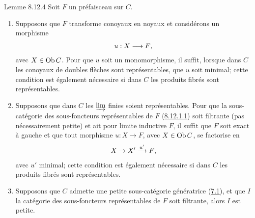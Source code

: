 \documentclass[10pt]{../fichiers-configuration-latex/smfart}
\def\labelenumi{(\theenumi)}
\begin{document}
\begin{enonce*}{Lemme 8.12.4}
Soit $F$ un préfaisceau sur $C$.
\begin{enumerate}
\renewcommand{\theenumi}{\alph{enumi}}
\renewcommand{\labelenumi}{\theenumi)}
\item Supposons que $F$ transforme conoyaux en noyaux et considérons
un morphisme
$$
u:X\longrightarrow F{},
$$
avec $X\in \operatorname{Ob} C$. Pour que $u$ soit un monomorphisme, il suffit,
lorsque dans $C$ les conoyaux de doubles flèches sont
représentables, que $u$ soit minimal; cette condition est également
nécessaire si dans $C$ les produits fibrés sont représentables.

\item Supposons que dans $C$ les $\varinjlim$ finies soient
représentables. Pour que %
la sous-catégorie des sous-foncteurs représentables de $F$
(\hyperref[I.8.12.1.1]{8.12.1.1}) soit filtrante (pas nécessairement petite) et ait
pour limite inductive $F$, il suffit que $F$ soit exact à gauche et
que tout morphisme $u:X\rightarrow F$, avec $X\in \operatorname{Ob} C$, se
factorise en
$$
X\rightarrow X'\xrightarrow{u'}F{},
$$
avec $u'$ minimal; cette condition est également nécessaire si dans
$C$ les produits fibrés sont représentables.

\item Supposons que $C$ admette une petite sous-catégorie
génératrice (\hyperref[I.def7.1]{7.1}), et que $I$ la catégorie des sous-foncteurs
représentables de $F$ soit filtrante, alors $I$ est petite.
\end{enumerate}
\end{enonce*}
\end{document}
